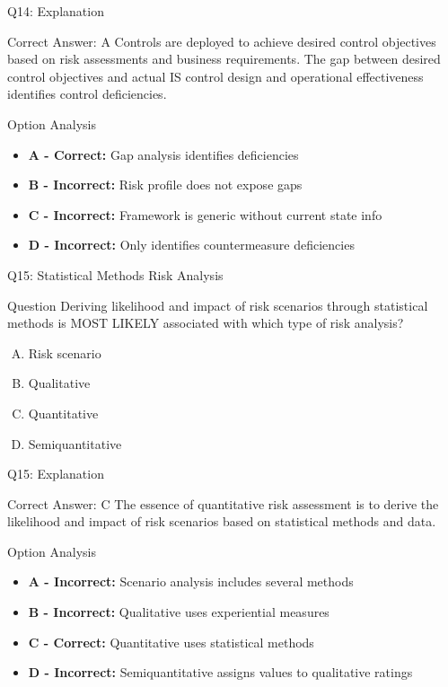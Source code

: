 \documentclass{beamer}
\begin{document}
	\begin{frame}{Q14: Explanation}
		\begin{block}{Correct Answer: A}
			Controls are deployed to achieve desired control objectives based on risk assessments and business requirements. The gap between desired control objectives and actual IS control design and operational effectiveness identifies control deficiencies.
		\end{block}
		\begin{block}{Option Analysis}
			\begin{itemize}
				\item \textbf{A - Correct:} Gap analysis identifies deficiencies
				\item \textbf{B - Incorrect:} Risk profile does not expose gaps
				\item \textbf{C - Incorrect:} Framework is generic without current state info
				\item \textbf{D - Incorrect:} Only identifies countermeasure deficiencies
			\end{itemize}
		\end{block}
	\end{frame}
	
	\begin{frame}{Q15: Statistical Methods Risk Analysis}
		\begin{block}{Question}
			Deriving likelihood and impact of risk scenarios through statistical methods is MOST LIKELY associated with which type of risk analysis?
		\end{block}
		\begin{enumerate}[(A)]
			\item Risk scenario
			\item Qualitative
			\item Quantitative
			\item Semiquantitative
		\end{enumerate}
	\end{frame}
	
	\begin{frame}{Q15: Explanation}
		\begin{block}{Correct Answer: C}
			The essence of quantitative risk assessment is to derive the likelihood and impact of risk scenarios based on statistical methods and data.
		\end{block}
		\begin{block}{Option Analysis}
			\begin{itemize}
				\item \textbf{A - Incorrect:} Scenario analysis includes several methods
				\item \textbf{B - Incorrect:} Qualitative uses experiential measures
				\item \textbf{C - Correct:} Quantitative uses statistical methods
				\item \textbf{D - Incorrect:} Semiquantitative assigns values to qualitative ratings
			\end{itemize}
		\end{block}
	\end{frame}
	
\end{document}
